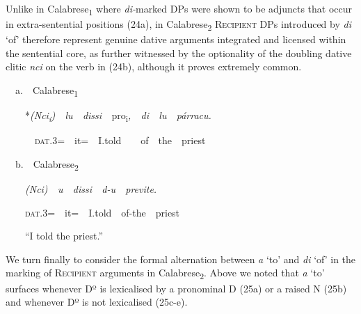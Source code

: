 \documentclass[output=paper,modfonts,nonflat]{langsci/langscibook}
\begin{document}
\begin{styleStandard}
Unlike in Calabrese\textsubscript{1} where \textit{di-}marked DPs were shown to be adjuncts that occur in extra-sentential positions (24a), in Calabrese\textsubscript{2} \textsc{Recipient} DPs introduced by \textit{di }‘of’ therefore represent genuine dative arguments integrated and licensed within the sentential core, as further witnessed by the optionality of the doubling dative clitic \textit{nci }on the verb in (24b), although it proves extremely common.
\end{styleStandard}

\begin{listWWNumviiileveli}
\item 
\begin{styleListParagraph}
\ \ a.\ \ Calabrese\textsubscript{1}
\end{styleListParagraph}
\end{listWWNumviiileveli}
\begin{styleListParagraph}
\ \ \ \ *\textit{(Nci}\textit{\textsubscript{i}}\textit{)\ \ lu\ \ dissi\ \ }pro\textsubscript{i}\textit{,\ \ di\ \ lu\ \ párracu.}
\end{styleListParagraph}

\begin{styleesempi}
\ \ \ \  \ \ \textsc{dat}.3=\ \ it=\ \ I.told\ \ \ \ of\ \ the\ \ priest
\end{styleesempi}

\begin{styleesempi}
\ \ b.\ \ Calabrese\textsubscript{2}
\end{styleesempi}

\begin{styleesempi}
\ \ \ \ \textit{(Nci)\ \ u\ \ dissi\ \ d-u\ \ previte.}
\end{styleesempi}

\begin{styleStandard}
\ \ \ \ \textsc{dat}.3=\ \ it=\ \ I.told\ \ of-the\ \ priest
\end{styleStandard}

\begin{styleStandard}
\ \ \ \ “I told the priest.”
\end{styleStandard}

\begin{styleStandard}
We turn finally to consider the formal alternation between \textit{a }‘to’ and \textit{di }‘of’ in the marking of \textsc{Recipient} arguments in Calabrese\textsubscript{2}. Above we noted that \textit{a }‘to’ surfaces whenever Dº is lexicalised by a pronominal D (25a) or a raised N (25b) and whenever Dº is not lexicalised (25c-e).
\end{styleStandard}
\end{document}
